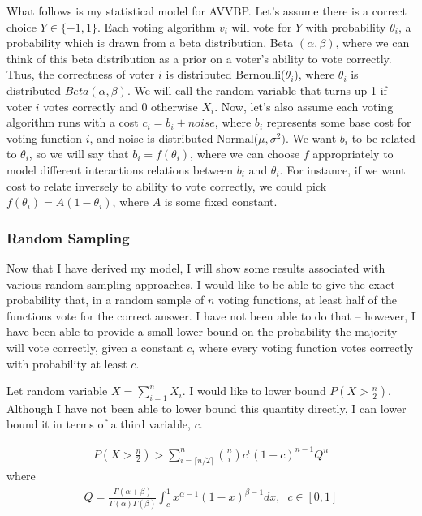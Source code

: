 What follows is my statistical model for AVVBP. Let's assume there is a correct choice $Y \in \{-1,1\}$. Each voting algorithm $v_i$ will vote for $Y$ with probability $\theta_i$, a probability which is drawn from a beta distribution, Beta $( \alpha, \beta)$, where we can think of this beta distribution as a prior on a voter's ability to vote correctly. Thus, the correctness of voter $i$ is distributed Bernoulli($\theta_i$), where $\theta_i$ is distributed $Beta (\alpha, \beta)$. We will call the random variable that turns up 1 if voter $i$ votes correctly and 0 otherwise $X_i$. Now, let's also assume each voting algorithm runs with a cost $c_i  = b_i + noise$, where $b_i$ represents some base cost for voting function $i$, and noise is distributed Normal($\mu, \sigma^2)$. We want $b_i$ to be related to $\theta_i$, so we will say that $b_i = f(\theta_i)$, where we can choose $f$ appropriately to model different interactions relations between $b_i$ and $\theta_i$. For instance, if we want cost to relate inversely to ability to vote correctly, we could pick $f(\theta_i) = A(1-\theta_i)$, where $A$ is some fixed constant. 

\subsubsection{Random Sampling}
Now that I have derived my model, I will show some results associated with various random sampling approaches. I would like to be able to give the exact probability that, in a random sample of $n$ voting functions, at least half of the functions vote for the correct answer. I have not been able to do that -- however, I have been able to provide a small lower bound on the probability the majority will vote correctly, given a constant $c$, where every voting function votes correctly with probability at least $c$.

Let random variable $X = \sum_{i=1}^n X_i$. I would like to lower bound $P(X > \frac{n}{2})$. Although I have not been able to lower bound this quantity directly, I can lower bound it in terms of a third variable, $c$. 

\begin{theorem}
\begin{align*}
P\left(X > \frac{n}{2}\right) > \sum_{i=\lceil n/2 \rceil}^{n} {n \choose i} c^i (1-c)^{n-1} Q^n
\end{align*}
where 
\begin{align*}
Q = \frac{\Gamma(\alpha + \beta)}{\Gamma(\alpha)\Gamma(\beta)}\int_{c}^{1} x^{\alpha - 1}(1-x)^{\beta-1}dx, \; \; c \in [0,1]
\end{align*}
\end{theorem}

